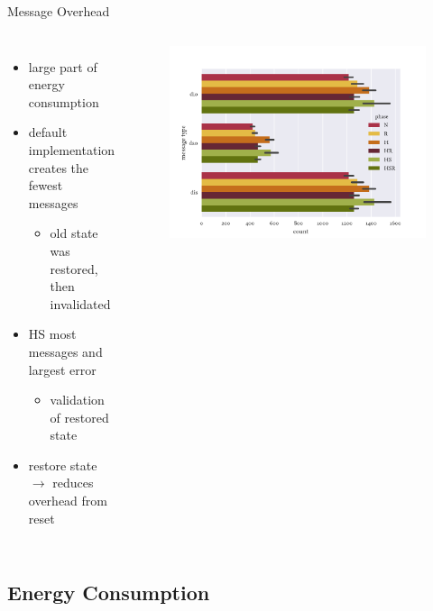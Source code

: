\documentclass[fleqn,11pt,aspectratio=1610]{beamer}
\begin{document}
\begin{frame}{Message Overhead}
  \begin{columns}
    \begin{itemize}
    \item<1-> large part of \textcolor{tubsRed}{energy consumption}
    \item<2-> default implementation creates the fewest messages
      \begin{itemize}
      \item old state was restored, then invalidated
      \end{itemize}
    \item<3-> HS most messages and largest error
      \begin{itemize}
      \item validation of restored state
      \end{itemize}
    \item<5-> \textcolor{tubsDarkGreen}{restore state $\rightarrow$ reduces
        overhead from reset}
    \end{itemize}
    
    \begin{figure}
      \centering
      \includegraphics[width=\textwidth]{../images/performance-overhead.pdf}
    \end{figure}
    \end{columns}
\end{frame}

\subsection{Energy Consumption}
\end{document}
